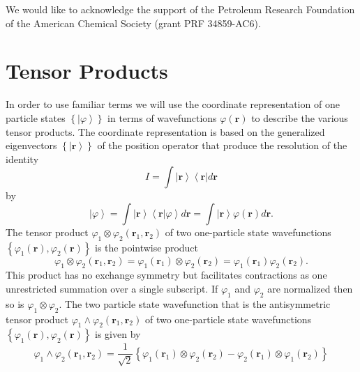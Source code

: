 \documentclass[preprint,aps,showkeys]{revtex4}%
\begin{document}
We would like to acknowledge the support of the Petroleum Research Foundation
of the American Chemical Society (grant PRF 34859-AC6).

\appendix

\section{Tensor Products\label{tensor}}

In order to use familiar terms we will use the coordinate representation of
one particle states $\left\{  \left\vert \varphi\right\rangle \right\}  $ in
terms of wavefunctions $\varphi\left(  \mathbf{r}\right)  $ to describe the
various tensor products. The coordinate representation is based on the
generalized eigenvectors $\left\{  \left\vert \mathbf{r}\right\rangle
\right\}  $ of the position operator that produce the resolution of the
identity
\begin{equation}
I=\int\left\vert \mathbf{r}\right\rangle \left\langle \mathbf{r}\right\vert
d\mathbf{r}%
\end{equation}
by%
\begin{equation}
\left\vert \varphi\right\rangle =\int\left\vert \mathbf{r}\right\rangle
\left\langle \mathbf{r}|\varphi\right\rangle d\mathbf{r=}\int\left\vert
\mathbf{r}\right\rangle \varphi\left(  \mathbf{r}\right)  d\mathbf{r.}%
\end{equation}
The tensor product $\varphi_{1}\otimes\varphi_{2}\left(  \mathbf{r}%
_{1},\mathbf{r}_{2}\right)  $ of two one-particle state wavefunctions
$\left\{  \varphi_{1}\left(  \mathbf{r}\right)  ,\varphi_{2}\left(
\mathbf{r}\right)  \right\}  $ is the pointwise product
\begin{equation}
\varphi_{1}\otimes\varphi_{2}\left(  \mathbf{r}_{1},\mathbf{r}_{2}\right)
=\varphi_{1}\left(  \mathbf{r}_{1}\right)  \otimes\varphi_{2}\left(
\mathbf{r}_{2}\right)  =\varphi_{1}\left(  \mathbf{r}_{1}\right)  \varphi
_{2}\left(  \mathbf{r}_{2}\right)  .
\end{equation}
This product has no exchange symmetry but facilitates contractions as one
unrestricted summation over a single subscript. If $\varphi_{1}$ and
$\varphi_{2}$ are normalized then so is $\varphi_{1}\otimes\varphi_{2}$. The
two particle state wavefunction that is the antisymmetric tensor product
$\varphi_{1}\wedge\varphi_{2}\left(  \mathbf{r}_{1},\mathbf{r}_{2}\right)  $
of two one-particle state wavefunctions $\left\{  \varphi_{1}\left(
\mathbf{r}\right)  ,\varphi_{2}\left(  \mathbf{r}\right)  \right\}  $ is given
by
\begin{equation}
\varphi_{1}\wedge\varphi_{2}\left(  \mathbf{r}_{1},\mathbf{r}_{2}\right)
=\frac{1}{\sqrt{2}}\left\{  \varphi_{1}\left(  \mathbf{r}_{1}\right)
\otimes\varphi_{2}\left(  \mathbf{r}_{2}\right)  -\varphi_{2}\left(
\mathbf{r}_{1}\right)  \otimes\varphi_{1}\left(  \mathbf{r}_{2}\right)
\right\}  \label{aten}%
\end{equation}
\end{document}
